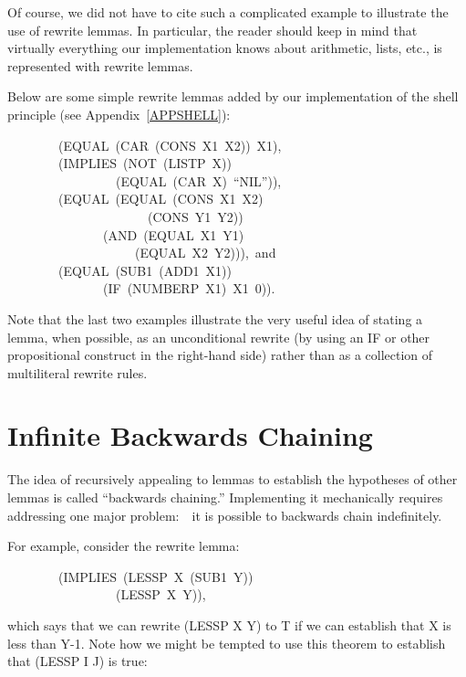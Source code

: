 \documentclass[10pt]{book}
\newenvironment{pubasis}{\begin{flushleft}}{\end{flushleft}}
\begin{document}
Of course, we did not have to cite such a complicated example to
illustrate the use of rewrite lemmas.  In particular, the reader
should keep in mind that virtually everything our implementation
knows about arithmetic, lists, etc., is represented with rewrite lemmas.

Below are some simple rewrite lemmas added by our implementation of
the shell principle (see Appendix~\ref{APPSHELL}):

\begin{pubasis}
~~~~~~~~(EQUAL~(CAR~(CONS~X1~X2))~X1),\\

~~~~~~~~(IMPLIES~(NOT~(LISTP~X))\\
~~~~~~~~~~~~~~~~~(EQUAL~(CAR~X)~``NIL'')),\\

~~~~~~~~(EQUAL~(EQUAL~(CONS~X1~X2)\\
~~~~~~~~~~~~~~~~~~~~~~(CONS~Y1~Y2))\\
~~~~~~~~~~~~~~~(AND~(EQUAL~X1~Y1)\\
~~~~~~~~~~~~~~~~~~~~(EQUAL~X2~Y2))),~and\\

~~~~~~~~(EQUAL~(SUB1~(ADD1~X1))\\
~~~~~~~~~~~~~~~(IF~(NUMBERP~X1)~X1~0)).\\
\end{pubasis}
Note that the last two examples illustrate the very useful  idea
of stating a lemma, when possible, as an unconditional rewrite (by using
an IF or other propositional construct in the right-hand side)
rather than as a collection of multiliteral rewrite rules.

\section{Infinite Backwards Chaining}
The idea of recursively appealing to lemmas to establish the hypotheses
of other lemmas is called ``backwards chaining.''  Implementing it mechanically
requires addressing one major problem:~~it is possible to backwards chain
indefinitely.

For example, consider the rewrite lemma:
\begin{pubasis}
~~~~~~~~(IMPLIES~(LESSP~X~(SUB1~Y))\\
~~~~~~~~~~~~~~~~~(LESSP~X~Y)),\\
\end{pubasis}
which says that we can rewrite (LESSP X Y) to T if we can establish
that X is less than Y-1.  Note how we might be tempted to
use this theorem to establish that (LESSP I J) is true:
\end{document}
